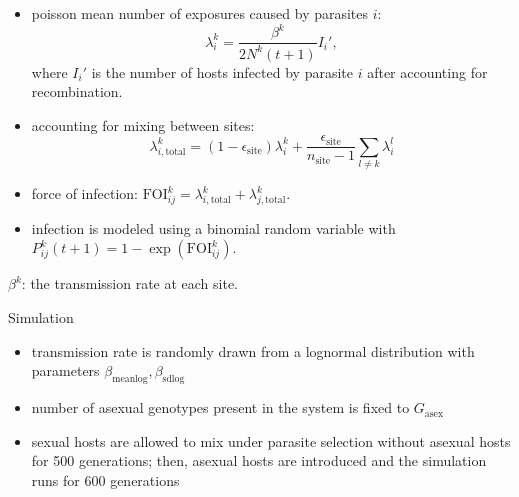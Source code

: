 \documentclass{beamer}
\begin{document}
\begin{frame}
\begin{itemize}
    \item poisson mean number of exposures caused by parasites $i$:
    $$
    \lambda_i^k = \frac{\beta^k}{2 N^k(t+1)} I_i',
    $$
    where $I_i'$ is the number of hosts infected by parasite $i$ after accounting for recombination.
    \item accounting for mixing between sites:
    $$
    \lambda_{i, \textrm{total}}^k = (1 - \epsilon_{\textrm{site}}) \lambda_i^k  + \frac{\epsilon_{\textrm{site}}}{n_{\textrm{site}}-1} \sum_{l \neq k} \lambda_i^l
    $$
    \item force of infection: $\mathrm{FOI}_{ij}^k = \lambda_{i, \textrm{total}}^k + \lambda_{j, \textrm{total}}^k$.
    \item infection is modeled using a binomial random variable with
    $P_{ij}^k(t+1) = 1 - \exp\left(\mathrm{FOI}_{ij}^k\right)$.
\end{itemize}
\vfill
$\beta^k$: the transmission rate at each site.
\end{frame}

\begin{frame}{Simulation}
\begin{itemize}
    \item transmission rate is randomly drawn from a lognormal distribution with parameters $\beta_{\textrm{meanlog}}, \beta_{\textrm{sdlog}}$
    \item number of asexual genotypes present in the system is fixed to $G_{\textrm{asex}}$
    \item sexual hosts are allowed to mix under parasite selection without asexual hosts for 500 generations; then, asexual hosts are introduced and the simulation runs for 600 generations
\end{itemize}
\vfill
\end{frame}
\end{document}
